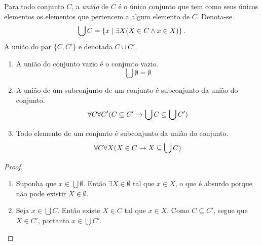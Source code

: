 \begin{definition}
Para todo conjunto $C$, a \emph{união} de $C$ é o único conjunto que tem como seus únicos elementos os elementos que pertencem a algum elemento de $C$. Denota-se
	\begin{equation*}
	\bigcup C = \left\{{x}\;\middle\vert\;{\exists X(X \in C \land x \in X)}\right\}.
	\end{equation*}
A união do par $\{C,C'\}$ e denotada $C \cup C'$.
\end{definition}

\begin{proposition}
	\begin{enumerate}
	\item A união do conjunto vazio é o conjunto vazio.
		\begin{equation*}
		\bigcup \emptyset = \emptyset
		\end{equation*}

	\item A união de um subconjunto de um conjunto é subconjunto da união do conjunto.
		\begin{equation*}
		\forall C \forall C' (C \subseteq C' \rightarrow \bigcup C \subseteq \bigcup C')
		\end{equation*}

	\item Todo elemento de um conjunto é subconjunto da união do conjunto.
		\begin{equation*}
		\forall C \forall X (X \in C \rightarrow X \subseteq \bigcup C)
		\end{equation*}
	\end{enumerate}
\end{proposition}
\begin{proof}
	\begin{enumerate}
	\item Suponha que $x \in \bigcup \emptyset$. Então $\exists X \in \emptyset$ tal que $x \in X$, o que é absurdo porque não pode existir $X \in \emptyset$.

	\item Seja $x \in \bigcup C$. Então existe $X \in C$ tal que $x \in X$. Como $C \subseteq C'$, segue que $X \in C'$, portanto $x \in \bigcup C'$. \qedhere
	\end{enumerate}
\end{proof}


